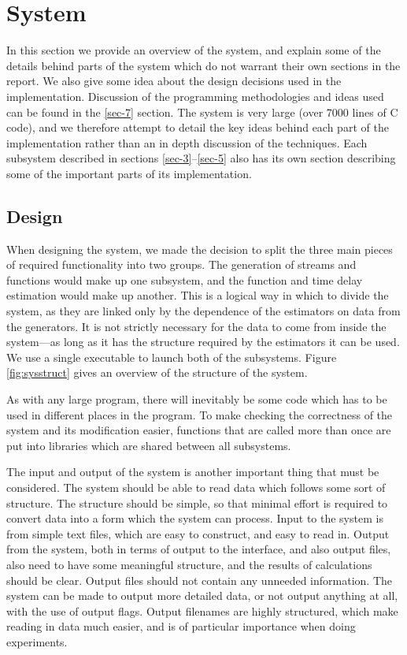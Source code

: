 \documentclass[a4paper,11pt]{article}
\begin{document}
\section{System}
\label{sec-6}

  In this section we provide an overview of the system, and explain some of the
  details behind parts of the system which do not warrant their own sections in
  the report. We also give some idea about the design decisions used in the
  implementation. Discussion of the programming methodologies and ideas used can
  be found in the \ref{sec-7} section. The system is very large (over 7000 lines
  of C code), and we therefore attempt to detail the key ideas behind each part
  of the implementation rather than an in depth discussion of the
  techniques. Each subsystem described in sections \ref{sec-3}--\ref{sec-5} also has its own section describing some of the
  important parts of its implementation.
\subsection{Design}
\label{sec-6-1}

   When designing the system, we made the decision to split the three main
   pieces of required functionality into two groups. The generation of streams
   and functions would make up one subsystem, and the function and time delay
   estimation would make up another. This is a logical way in which to divide
   the system, as they are linked only by the dependence of the estimators on
   data from the generators. It is not strictly necessary for the data to come
   from inside the system---as long as it has the structure required by the
   estimators it can be used. We use a single executable to launch both of the
   subsystems. Figure \ref{fig:sysstruct} gives an overview of the structure of
   the system.

   As with any large program, there will inevitably be some code which has to be
   used in different places in the program. To make checking the correctness of
   the system and its modification easier, functions that are called more than
   once are put into libraries which are shared between all subsystems.

   The input and output of the system is another important thing that must be
   considered. The system should be able to read data which follows some sort of
   structure. The structure should be simple, so that minimal effort is required
   to convert data into a form which the system can process. Input to the system
   is from simple text files, which are easy to construct, and easy to read
   in. Output from the system, both in terms of output to the interface, and
   also output files, also need to have some meaningful structure, and the
   results of calculations should be clear. Output files should not contain any
   unneeded information. The system can be made to output more detailed data, or
   not output anything at all, with the use of output flags. Output filenames
   are highly structured, which make reading in data much easier, and is of
   particular importance when doing experiments.
\end{document}
